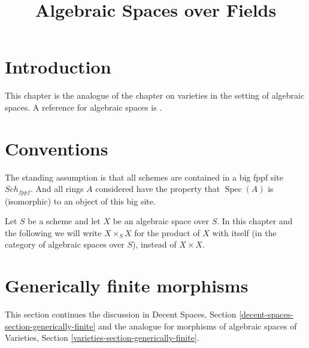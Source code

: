\documentclass{stacks-project}
\theoremstyle{plain}
\theoremstyle{definition}
\theoremstyle{remark}
\numberwithin{equation}{subsection}
\def\Spec{\mathop{\mathrm{Spec}}}
\def\Sch{\mathit{Sch}}
\begin{document}
\title{Algebraic Spaces over Fields}


\maketitle

\label{section-phantom}

\tableofcontents

\section{Introduction}
\label{section-introduction}

\noindent
This chapter is the analogue of the chapter on varieties in the setting
of algebraic spaces. A reference for algebraic spaces is
\cite{Kn}.


\section{Conventions}
\label{section-conventions}

\noindent
The standing assumption is that all schemes are contained in
a big fppf site $\Sch_{fppf}$. And all rings $A$ considered
have the property that $\Spec(A)$ is (isomorphic) to an
object of this big site.

\medskip\noindent
Let $S$ be a scheme and let $X$ be an algebraic space over $S$.
In this chapter and the following we will write $X \times_S X$
for the product of $X$ with itself (in the category of algebraic
spaces over $S$), instead of $X \times X$.



\section{Generically finite morphisms}
\label{section-generically-finite}

\noindent
This section continues the discussion in
Decent Spaces, Section \ref{decent-spaces-section-generically-finite}
and the analogue for morphisms of algebraic spaces of
Varieties, Section \ref{varieties-section-generically-finite}.
\end{document}

